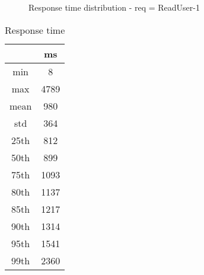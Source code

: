 \begin{minipage}{0.75\linewidth}
\begin{figure}[h]
\begin{adjustbox}{max width=1.0\linewidth, keepaspectratio}
  \end{adjustbox}
  \caption{Response time distribution - req = ReadUser-1}
\end{figure}
\end{minipage}\hfill\begin{minipage}{0.18\linewidth}
\begin{table}[h]
\begin{tabular}{|cc|}
\hline
\textbf{} & \textbf{ms}\\ \hline
 \Xhline{0.005\arrayrulewidth}
min & 8\\
 \Xhline{0.005\arrayrulewidth}
max & 4789\\
 \Xhline{0.005\arrayrulewidth}
mean & 980\\
 \Xhline{0.005\arrayrulewidth}
std & 364\\
\hline
\hline
 \Xhline{0.005\arrayrulewidth}
25th & 812\\
 \Xhline{0.005\arrayrulewidth}
50th & 899\\
 \Xhline{0.005\arrayrulewidth}
75th & 1093\\
 \Xhline{0.005\arrayrulewidth}
80th & 1137\\
 \Xhline{0.005\arrayrulewidth}
85th & 1217\\
 \Xhline{0.005\arrayrulewidth}
90th & 1314\\
 \Xhline{0.005\arrayrulewidth}
95th & 1541\\
 \Xhline{0.005\arrayrulewidth}
99th & 2360\\
\hline
\end{tabular}
\caption{Response time}
\end{table}
\end{minipage}\hfill